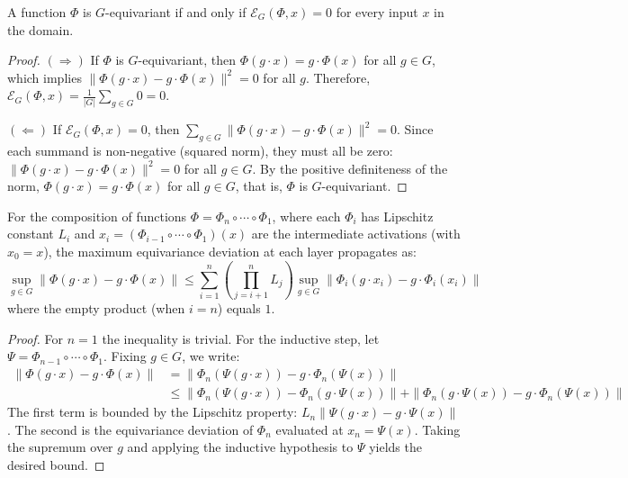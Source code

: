 \begin{theorem}\label{thm:criterio_equivarianza}
A function $\Phi$ is $G$-equivariant if and only if $\mathcal{E}_G(\Phi, x) = 0$ for every input $x$ in the domain.
\end{theorem}

\begin{proof}
$(\Rightarrow)$ If $\Phi$ is $G$-equivariant, then $\Phi(g \cdot x) = g \cdot \Phi(x)$ for all $g \in G$, which implies $\|\Phi(g \cdot x) - g \cdot \Phi(x)\|^2 = 0$ for all $g$. Therefore, $\mathcal{E}_G(\Phi, x) = \frac{1}{|G|} \sum_{g \in G} 0 = 0$.

$(\Leftarrow)$ If $\mathcal{E}_G(\Phi, x) = 0$, then $\sum_{g \in G} \|\Phi(g \cdot x) - g \cdot \Phi(x)\|^2 = 0$. Since each summand is non-negative (squared norm), they must all be zero: $\|\Phi(g \cdot x) - g \cdot \Phi(x)\|^2 = 0$ for all $g \in G$. By the positive definiteness of the norm, $\Phi(g \cdot x) = g \cdot \Phi(x)$ for all $g \in G$, that is, $\Phi$ is $G$-equivariant.
\end{proof}

\begin{proposition}\label{prop:propagacion_error}
For the composition of functions $\Phi = \Phi_n \circ \cdots \circ \Phi_1$, where each $\Phi_i$ has Lipschitz constant $L_i$ and $x_i = (\Phi_{i-1} \circ \cdots \circ \Phi_1)(x)$ are the intermediate activations (with $x_0 = x$), the maximum equivariance deviation at each layer propagates as:
\begin{equation}
\sup_{g \in G}\|\Phi(g \cdot x) - g \cdot \Phi(x)\| \leq \sum_{i=1}^{n} \left(\prod_{j=i+1}^{n} L_j\right) \sup_{g \in G}\|\Phi_i(g \cdot x_i) - g \cdot \Phi_i(x_i)\|
\end{equation}
where the empty product (when $i = n$) equals $1$.
\end{proposition}

\begin{proof}
For $n = 1$ the inequality is trivial. For the inductive step, let $\Psi = \Phi_{n-1} \circ \cdots \circ \Phi_1$. Fixing $g \in G$, we write:
\begin{align}
\|\Phi(g \cdot x) - g \cdot \Phi(x)\| &= \|\Phi_n(\Psi(g \cdot x)) - g \cdot \Phi_n(\Psi(x))\| \\
&\leq \|\Phi_n(\Psi(g \cdot x)) - \Phi_n(g \cdot \Psi(x))\| + \|\Phi_n(g \cdot \Psi(x)) - g \cdot \Phi_n(\Psi(x))\|
\end{align}
The first term is bounded by the Lipschitz property: $L_n \|\Psi(g \cdot x) - g \cdot \Psi(x)\|$. The second is the equivariance deviation of $\Phi_n$ evaluated at $x_n = \Psi(x)$. Taking the supremum over $g$ and applying the inductive hypothesis to $\Psi$ yields the desired bound.
\end{proof}

